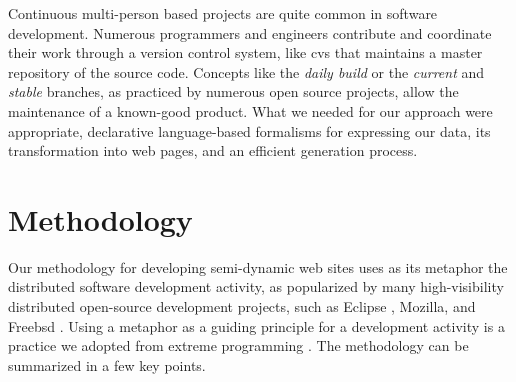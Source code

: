 \documentclass{elsart}
\begin{document}
Continuous multi-person based projects are quite
common in software development.
Numerous programmers and engineers contribute and coordinate their work
through a version control system, like {\sc cvs} \cite{BF01} that
maintains a master repository of the source code.
Concepts like the \textit{daily build} \cite{KAL00} or the
\textit{current} and \textit{stable} branches, as practiced by
numerous open source projects, allow the maintenance
of a known-good product.
What we needed for our approach were appropriate,
declarative language-based formalisms for expressing our data,
its transformation into web pages, and an efficient
generation process.

\section{Methodology}
\label{sec:meth}
Our methodology for developing semi-dynamic web sites uses as
its metaphor the distributed software development activity, as popularized
by many high-visibility distributed open-source development projects,
such as Eclipse \cite{GB04}, Mozilla, and Free{\sc bsd} \cite{Jor01}.
Using a metaphor as a guiding principle for a development activity
is a practice we adopted from extreme programming \cite{Bec00}.
The methodology can be summarized in a few key points.
\end{document}
